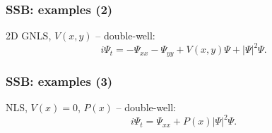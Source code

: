 \documentclass{beamer}
\begin{document}
\begin{frame}
\frametitle{SSB: examples (2)}

2D GNLS, $V(x, y)$ -- double-well\footnotemark[3]:
$$i \Psi_t = -\Psi_{xx} - \Psi_{yy} + V(x, y) \Psi + |\Psi|^2 \Psi.$$

\begin{figure}
\label{pic:ssb_ex2}
\end{figure}

\end{frame}


\begin{frame}
\frametitle{SSB: examples (3)}

NLS, $V(x) = 0$, $P(x)$ -- double-well\footnotemark[4]:
$$i \Psi_t = \Psi_{xx} + P(x) |\Psi|^2 \Psi.$$

\begin{figure}
\label{pic:ssb_ex3}
\end{figure}

\end{frame}
\end{document}
